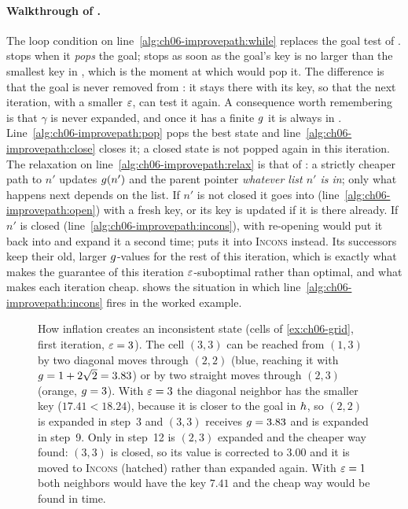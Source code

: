\paragraph{Walkthrough of .}
The loop condition on line~\ref{alg:ch06-improvepath:while} replaces the goal
test of \astar. \astar stops when it \emph{pops} the goal; \AraImprovePath
stops as soon as the goal's key is no larger than the smallest key in \Open,
which is the moment at which \astar would pop it. The difference is that the
goal is never removed from \Open: it stays there with its key, so that the next
iteration, with a smaller $\varepsilon$, can test it again. A consequence worth
remembering is that $\gamma$ is never expanded, and once it has a finite
$g$ it is always in \Open. Line~\ref{alg:ch06-improvepath:pop} pops the
best state and line~\ref{alg:ch06-improvepath:close} closes it; a closed state
is not popped again in this iteration. The relaxation on
line~\ref{alg:ch06-improvepath:relax} is that of \astar: a strictly cheaper
path to $n'$ updates $g(n')$ and the parent pointer \emph{whatever list
$n'$ is in}; only what happens next depends on the list. If $n'$ is not closed it goes
into \Open (line~\ref{alg:ch06-improvepath:open}) with a fresh key, or its key
is updated if it is there already. If $n'$ is closed
(line~\ref{alg:ch06-improvepath:incons}), \astar with re-opening would put it
back into \Open and expand it a second time; \arastar puts it into
\textsc{Incons} instead. Its successors keep their old, larger $g$-values
for the rest of this iteration, which is exactly what makes the guarantee of
this iteration $\varepsilon$-suboptimal rather than optimal, and what makes each
iteration cheap.  shows the situation in which
line~\ref{alg:ch06-improvepath:incons} fires in the worked example.

\begin{figure}[tb]
  \centering
  \caption{How inflation creates an inconsistent state (cells of
  \cref{ex:ch06-grid}, first iteration, $\varepsilon = 3$). The cell $(3,3)$ can be
  reached from $(1,3)$ by two diagonal moves through $(2,2)$ (blue, reaching it with
  $g = 1 + 2\sqrt{2} = 3.83$) or by two straight moves through $(2,3)$
  (orange, $g = 3$). With $\varepsilon = 3$ the diagonal neighbor has the smaller key
  ($17.41 < 18.24$), because it is closer to the goal in $h$, so
  $(2,2)$ is expanded in step~3 and $(3,3)$ receives $g = 3.83$ and is
  expanded in step~9. Only in step~12 is $(2,3)$ expanded and the cheaper way
  found: $(3,3)$ is closed, so its value is corrected to $3.00$ and it is moved
  to \textsc{Incons} (hatched) rather than expanded again. With $\varepsilon = 1$ both
  neighbors would have the key $7.41$ and the cheap way would be found in
  time.}
  \label{fig:ch06-incons}
\end{figure}

